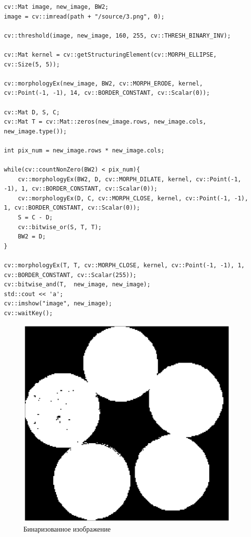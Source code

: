\begin{lstlisting}[style=cpp_white, caption={Исходный код для разделения и выделения контуров}]
cv::Mat image, new_image, BW2;
image = cv::imread(path + "/source/3.png", 0);

cv::threshold(image, new_image, 160, 255, cv::THRESH_BINARY_INV);

cv::Mat kernel = cv::getStructuringElement(cv::MORPH_ELLIPSE, cv::Size(5, 5));

cv::morphologyEx(new_image, BW2, cv::MORPH_ERODE, kernel, cv::Point(-1, -1), 14, cv::BORDER_CONSTANT, cv::Scalar(0));

cv::Mat D, S, C;
cv::Mat T = cv::Mat::zeros(new_image.rows, new_image.cols, new_image.type());

int pix_num = new_image.rows * new_image.cols;

while(cv::countNonZero(BW2) < pix_num){
    cv::morphologyEx(BW2, D, cv::MORPH_DILATE, kernel, cv::Point(-1, -1), 1, cv::BORDER_CONSTANT, cv::Scalar(0));
    cv::morphologyEx(D, C, cv::MORPH_CLOSE, kernel, cv::Point(-1, -1), 1, cv::BORDER_CONSTANT, cv::Scalar(0));
    S = C - D;
    cv::bitwise_or(S, T, T);
    BW2 = D;
}

cv::morphologyEx(T, T, cv::MORPH_CLOSE, kernel, cv::Point(-1, -1), 1, cv::BORDER_CONSTANT, cv::Scalar(255));
cv::bitwise_and(T,  new_image, new_image);
std::cout << 'a';
cv::imshow("image", new_image);
cv::waitKey();
\end{lstlisting}

\begin{figure}[H]
    \includegraphics[width=\textwidth]{../outputs/2_mask.png}
    \caption{Бинаризованное изображение}
\end{figure}

